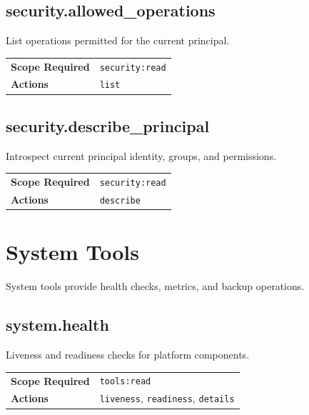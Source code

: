 \subsection{security.allowed\_operations}

List operations permitted for the current principal.

\begin{table}[ht]
\centering
\small
\begin{tabularx}{\textwidth}{lX}
    \hline
    \textbf{Scope Required} & \texttt{security:read} \\
    \textbf{Actions} & \texttt{list} \\
    \hline
\end{tabularx}
\end{table}

\subsection{security.describe\_principal}

Introspect current principal identity, groups, and permissions.

\begin{table}[ht]
\centering
\small
\begin{tabularx}{\textwidth}{lX}
    \hline
    \textbf{Scope Required} & \texttt{security:read} \\
    \textbf{Actions} & \texttt{describe} \\
    \hline
\end{tabularx}
\end{table}

\section{System Tools}
\label{app:tools:system}

System tools provide health checks, metrics, and backup operations.

\subsection{system.health}

Liveness and readiness checks for platform components.

\begin{table}[ht]
\centering
\small
\begin{tabularx}{\textwidth}{lX}
    \hline
    \textbf{Scope Required} & \texttt{tools:read} \\
    \textbf{Actions} & \texttt{liveness}, \texttt{readiness}, \texttt{details} \\
    \hline
\end{tabularx}
\end{table}

